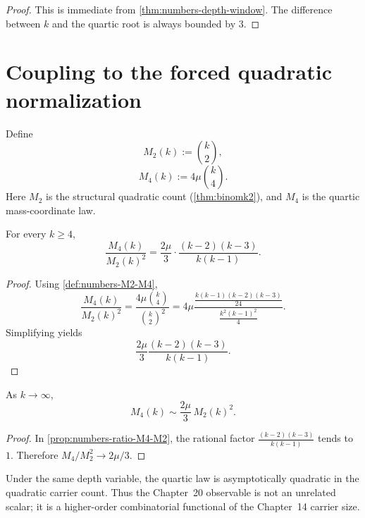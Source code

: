 \begin{proof}
This is immediate from \cref{thm:numbers-depth-window}.
The difference between \(k\) and the quartic root is always bounded by
\(3\).
\end{proof}

\section{Coupling to the forced quadratic normalization}
\label{sec:numbers-quadratic-coupling}

\begin{definition}
\label{def:numbers-M2-M4}
Define
\[
  M_2(k):=\binom{k}{2},
\]
\[
  M_4(k):=4\mu\binom{k}{4}.
\]
Here \(M_2\) is the structural quadratic count
(\cref{thm:binomk2}), and \(M_4\) is the quartic mass-coordinate law.
\end{definition}

\begin{proposition}
\label{prop:numbers-ratio-M4-M2}
For every \(k\ge4\),
\[
  \frac{M_4(k)}{M_2(k)^2}
  =
  \frac{2\mu}{3}
  \cdot
  \frac{(k-2)(k-3)}{k(k-1)}.
\]
\end{proposition}

\begin{proof}
Using \cref{def:numbers-M2-M4},
\[
  \frac{M_4(k)}{M_2(k)^2}
  =
  \frac{4\mu\binom{k}{4}}{\binom{k}{2}^2}
  =
  4\mu
  \frac{\frac{k(k-1)(k-2)(k-3)}{24}}
       {\frac{k^2(k-1)^2}{4}}.
\]
Simplifying yields
\[
  \frac{2\mu}{3}\frac{(k-2)(k-3)}{k(k-1)}.
\]
\end{proof}

\begin{corollary}
\label{cor:numbers-asymptotic-quadratic-coupling}
As \(k\to\infty\),
\[
  M_4(k)
  \sim
  \frac{2\mu}{3}\,M_2(k)^2.
\]
\end{corollary}

\begin{proof}
In \cref{prop:numbers-ratio-M4-M2}, the rational factor
\(
  \frac{(k-2)(k-3)}{k(k-1)}
\)
tends to \(1\).
Therefore
\(
  M_4/M_2^2\to 2\mu/3
\).
\end{proof}

\begin{remark}
\label{rem:numbers-coupling-interpretation}
Under the same depth variable, the quartic law is asymptotically quadratic
in the quadratic carrier count.
Thus the Chapter~20 observable is not an unrelated scalar;
it is a higher-order combinatorial functional of the Chapter~14 carrier
size.
\end{remark}

